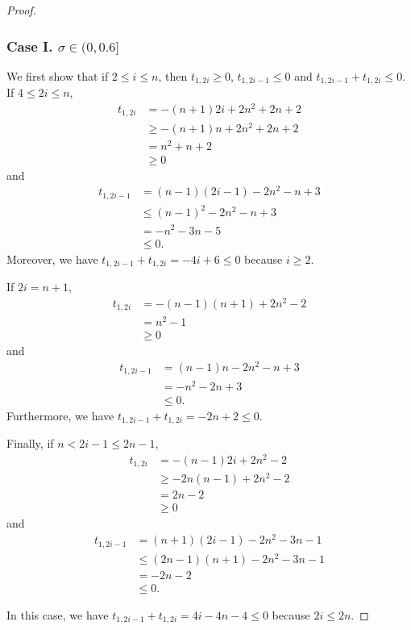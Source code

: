 \documentclass{article}
\theoremstyle{plain}
\theoremstyle{definition}
\theoremstyle{remark}
\begin{document}
\begin{proof}
\subsubsection*{Case I. $\sigma \in (0, 0.6]$}

We first show that if $2\le i\le n$, then $t_{1,2i}\ge 0$, $t_{1,2i-1}\le 0$ and $t_{1,2i-1} + t_{1,2i} \le 0$. 
If $4\le 2i\le n$,
\begin{align*}
    t_{1,2i} &= -(n+1)2i + 2n^2 + 2n + 2 \\
    &\ge -(n+1)n+2n^2+2n+2 \\
    &= n^2+n+2 \\
    &\ge 0
\end{align*}
and
\begin{align*}
    t_{1,2i-1} &= (n-1)(2i-1) - 2n^2 - n + 3 \\
    &\le (n-1)^2-2n^2-n+3 \\
    &= -n^2-3n-5 \\
    &\le 0.
\end{align*}
Moreover, we have $t_{1,2i-1} + t_{1,2i} = -4i + 6 \le 0$ because $i\ge 2$.

If $2i=n+1$,
\begin{align*}
    t_{1,2i} &= -(n-1)(n+1) + 2n^2 - 2 \\
    &= n^2-1 \\
    &\ge 0
\end{align*}
and 
\begin{align*}
    t_{1,2i-1} &= (n-1)n - 2n^2 - n + 3 \\
    &= -n^2 - 2n +3 \\
    &\le 0.
\end{align*}
Furthermore, we have $t_{1,2i-1} + t_{1,2i} = -2n + 2 \le 0$.

Finally, if $n < 2i-1 \le 2n-1$,
\begin{align*}
t_{1,2i} &= -(n-1)2i + 2n^2 - 2 \\
&\ge -2n(n-1) + 2n^2 - 2 \\
&= 2n - 2 \\
&\ge 0
\end{align*}
and
\begin{align*}
t_{1,2i-1} &= (n+1)(2i-1) - 2n^2 - 3n - 1 \\
&\le (2n-1)(n+1) - 2n^2 - 3n - 1 \\
&= -2n - 2 \\
&\le 0.
\end{align*}

In this case, we have $t_{1,2i-1} + t_{1,2i} = 4i - 4n - 4 \le 0$ because $2i\le 2n$.


\end{proof}
\end{document}
